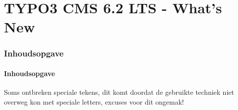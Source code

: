 \section*{TYPO3 CMS 6.2 LTS - What's New}
\begin{frame}[fragile]
	\frametitle{Inhoudsopgave}
	\framesubtitle{ Inhoudsopgave}

	\begin{multicols}{2}
		\tableofcontents
	\end{multicols}
	
	Soms ontbreken speciale tekens, dit komt doordat de gebruikte techniek niet overweg kon met speciale letters, excuses voor dit ongemak!

\end{frame}



















